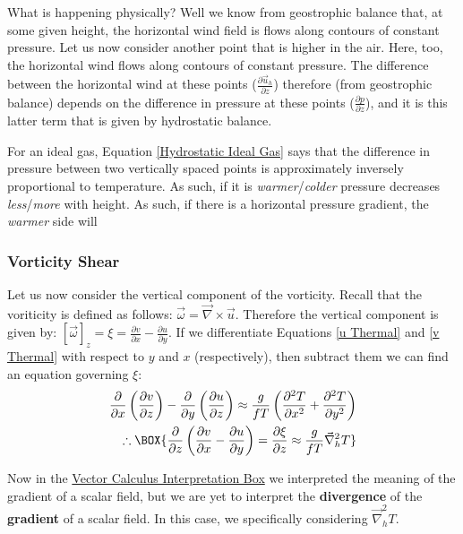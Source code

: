 What is happening physically? Well we know from geostrophic balance that, at some given height, the horizontal wind field is flows along contours of constant pressure. Let us now consider another point that is higher in the air. Here, too, the horizontal wind flows along contours of constant pressure. The difference between the horizontal wind at these points (\(\frac{\partial \vec{u}_h}{\partial z}\)) therefore (from geostrophic balance) depends on the difference in pressure at these points (\(\frac{\partial p}{\partial z}\)), and it is this latter term that is given by hydrostatic balance. 

For an ideal gas, Equation \ref{Hydrostatic Ideal Gas} says that the difference in pressure between two vertically spaced points is approximately inversely proportional to temperature. As such, if it is \textit{warmer}/\textit{colder} pressure decreases \textit{less}/\textit{more} with height. As such, if there is a horizontal pressure gradient, the \textit{warmer} side will 

\subsubsection{Vorticity Shear}

Let us now consider the vertical component of the vorticity. Recall that the voriticity is defined as follows: \(\vec{\omega}=\vec{\nabla}\times\vec{u}\). Therefore the vertical component is given by: \([\vec{\omega}]_z=\xi=\frac{\partial v}{\partial x}-\frac{\partial u}{\partial y}\). If we differentiate Equations \ref{u Thermal} and \ref{v Thermal} with respect to \(y\) and \(x\) (respectively), then subtract them we can find an equation governing \(\xi\):
\begin{align}
    \frac{\partial}{\partial x}\left( \frac{\partial v}{\partial z} \right) - \frac{\partial}{\partial y}\left( \frac{\partial u}{\partial z} \right)
    \approx
    \frac{g}{fT}\left( 
        \frac{\partial^2 T}{\partial x^2}+\frac{\partial^2 T}{\partial y^2}
     \right)\nonumber
     \\
    \label{Thermal Wind Vorticity}
    \therefore
    \BOX{
        \frac{\partial}{\partial z}\left( \frac{\partial v}{\partial x}- \frac{\partial u}{\partial y} \right)=
        \frac{\partial \xi}{\partial z}
        \approx
        \frac{g}{fT}\vec{\nabla}_h^2 T
    }
\end{align}

Now in the \hyperref[VC Interp]{Vector Calculus Interpretation Box} we interpreted the meaning of the gradient of a scalar field, but we are yet to interpret the \textbf{divergence} of the \textbf{gradient} of a scalar field. In this case, we specifically considering \(\vec{\nabla}_h^2 T\).

